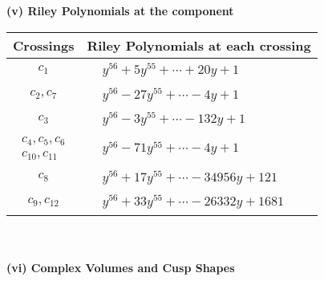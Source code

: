\documentclass[1p]{elsarticle_modified}
\theoremstyle{definition}
\begin{document}
\newpage\renewcommand{\arraystretch}{1}
\flushleft \textbf{(v) Riley Polynomials at the component}\newline \\
\begin{tabular}{m{50pt}|m{274pt}}
Crossings & \hspace{64pt}Riley Polynomials at each crossing \\
\hline $$\begin{aligned}c_{1}\end{aligned}$$&$\begin{aligned}
&y^{56}+5 y^{55}+\cdots+20 y+1
\end{aligned}$\\
\hline $$\begin{aligned}c_{2},c_{7}\end{aligned}$$&$\begin{aligned}
&y^{56}-27 y^{55}+\cdots-4 y+1
\end{aligned}$\\
\hline $$\begin{aligned}c_{3}\end{aligned}$$&$\begin{aligned}
&y^{56}-3 y^{55}+\cdots-132 y+1
\end{aligned}$\\
\hline $$\begin{aligned}c_{4},c_{5},c_{6}\\c_{10},c_{11}\end{aligned}$$&$\begin{aligned}
&y^{56}-71 y^{55}+\cdots-4 y+1
\end{aligned}$\\
\hline $$\begin{aligned}c_{8}\end{aligned}$$&$\begin{aligned}
&y^{56}+17 y^{55}+\cdots-34956 y+121
\end{aligned}$\\
\hline $$\begin{aligned}c_{9},c_{12}\end{aligned}$$&$\begin{aligned}
&y^{56}+33 y^{55}+\cdots-26332 y+1681
\end{aligned}$\\
\hline
\end{tabular}\\~\\
\newpage\flushleft \textbf{(vi) Complex Volumes and Cusp Shapes}
\end{document}
